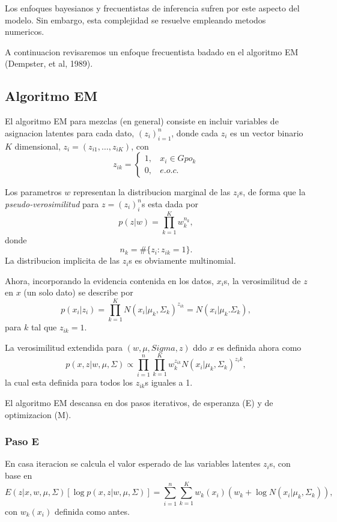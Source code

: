 \documentclass[11pt,]{article}
\begin{document}
Los enfoques bayesianos y frecuentistas de inferencia sufren por este
aspecto del modelo. Sin embargo, esta complejidad se resuelve empleando
metodos numericos.

A continuacion revisaremos un enfoque frecuentista badado en el
algoritmo EM (Dempster, et al, 1989).

\subsection{Algoritmo EM}\label{algoritmo-em}

El algoritmo EM para mezclas (en general) consiste en incluir variables
de asignacion latentes para cada dato, \((z_i)_{i=1}^{n}\), donde cada
\(z_i\) es un vector binario \(K\) dimensional,
\(z_i=(z_{i1},\ldots,z_{iK})\), con \[
z_{ik} = \begin{cases}
      1, \ \ \ \ x_i \in Gpo_{k} \\
      0, \ \ \ \ e.o.c.
      \end{cases}
\]

Los parametros \(w\) representan la distribucion marginal de las
\(z_i\)s, de forma que la \emph{pseudo-verosimilitud} para
\(z=(z_i)_{i}^{n}\)s esta dada por \[
p(z|w)=\prod_{k=1}^{K}w_{k}^{n_k},
\] donde \[
n_k=\#\{z_i:z_{ik}=1\}.
\] La distribucion implicita de las \(z_i\)s es obviamente multinomial.

Ahora, incorporando la evidencia contenida en los datos, \(x_i\)s, la
verosimilitud de \(z\) en \(x\) (un solo dato) se describe por \[
p(x_i|z_i)=\prod_{k=1}^{K}N(x_i|\mu_k,\Sigma_k)^{z_{ik}}=N(x_i|\mu_{k}.\Sigma_{k}),
\] para \(k\) tal que \(z_{ik}=1\).

La verosimilitud extendida para \((w,\mu,Sigma,z)\) ddo \(x\) es
definida ahora como \[
p(x,z|w,\mu,\Sigma)\propto \prod_{i=1}^{n}\prod_{k=1}^{K}w_k^{z_{ik}}N(x_{i}|\mu_k,\Sigma_k)^{z_ik},
\] la cual esta definida para todos los \(z_{ik}\)s iguales a 1.

El algoritmo EM descansa en dos pasos iterativos, de esperanza (E) y de
optimizacion (M).

\subsubsection{Paso E}\label{paso-e}

En casa iteracion se calcula el valor esperado de las variables latentes
\(z_i\)s, con base en \[
E(z|x,w,\mu,\Sigma)\left[\log p(x,z|w,\mu,\Sigma)\right]=\sum_{i=1}^{n}\sum_{k=1}^{K}w_k(x_i)\left(w_k+\log N(x_i|\mu_k,\Sigma_k)\right),
\] con \(w_k(x_i)\) definida como antes.
\end{document}
